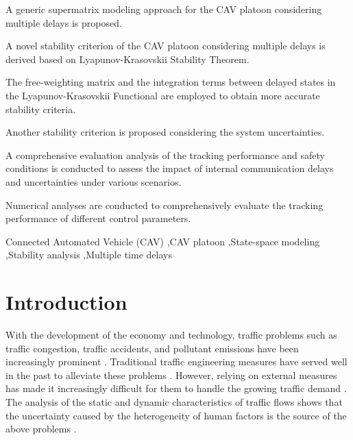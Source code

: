 \documentclass[a4paper]{cas-sc}
\begin{document}
\begin{highlights}
  \item A generic supermatrix modeling approach for the CAV platoon considering multiple delays is proposed.
  \item A novel stability criterion of the CAV platoon considering multiple delays is derived based on Lyapunov-Krasovskii Stability Theorem.
  \item The free-weighting matrix and the integration terms between delayed states in the Lyapunov-Krasovskii Functional are employed to obtain more accurate stability criteria.
  \item Another stability criterion is proposed considering the system uncertainties.
  \item A comprehensive evaluation analysis of the tracking performance and safety conditions is conducted to assess the impact of internal communication delays and uncertainties under various scenarios.
  \item Numerical analyses are conducted to comprehensively evaluate the tracking performance of different control parameters.
\end{highlights}

\begin{keywords}
  Connected Automated Vehicle (CAV) \sep CAV platoon \sep State-space modeling \sep Stability analysis \sep Multiple time delays
\end{keywords}


\maketitle

\section{Introduction}
\label{Section 1}

With the development of the economy and technology, traffic problems such as traffic congestion, traffic accidents, and pollutant emissions have been increasingly prominent \citep{Wu2022,Malik2022,Behrendt2022}. Traditional traffic engineering measures have served well in the past to alleviate these problems \citep{Fricker2004,Hay1977}. However, relying on external measures has made it increasingly difficult for them to handle the growing traffic demand \citep{Zhong2020a,Ye2018a}. The analysis of the static and dynamic characteristics of traffic flows shows that the uncertainty caused by the heterogeneity of human factors is the source of the above problems \citep{Arem2016a,Yu2021a,vanLint2016}.
\end{document}
